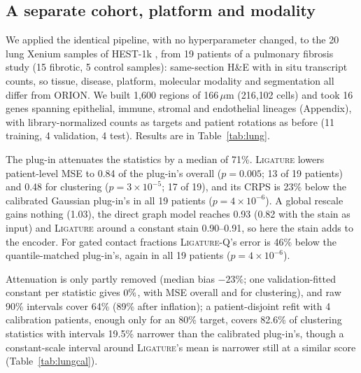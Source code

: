 \documentclass[10pt,letterpaper]{article}
\theoremstyle{definition}
\theoremstyle{remark}
\newcommand{\method}{\textnormal{\textsc{Ligature}}}
\begin{document}
\subsection{A separate cohort, platform and modality}
We applied the identical pipeline, with no hyperparameter changed, to the 20 lung Xenium samples of HEST-1k \citep{hest2024}, from 19 patients of a pulmonary fibrosis study \citep{vannan2025} (15 fibrotic, 5 control samples): same-section H\&E with in situ transcript counts, so tissue, disease, platform, molecular modality and segmentation all differ from ORION. We built 1{,}600 regions of 166\,$\mu$m (216{,}102 cells) and took 16 genes spanning epithelial, immune, stromal and endothelial lineages (Appendix), with library-normalized counts as targets and patient rotations as before (11 training, 4 validation, 4 test). Results are in Table~\ref{tab:lung}.

The plug-in attenuates the statistics by a median of 71\%. \method{} lowers patient-level MSE to 0.84 of the plug-in's overall ($p=0.005$; 13 of 19 patients) and 0.48 for clustering ($p=3\times10^{-5}$; 17 of 19), and its CRPS is 23\% below the calibrated Gaussian plug-in's in all 19 patients ($p=4\times10^{-6}$). A global rescale gains nothing (1.03), the direct graph model reaches 0.93 (0.82 with the stain as input) and \method{} around a constant stain 0.90--0.91, so here the stain adds to the encoder. For gated contact fractions \method{}-Q's error is 46\% below the quantile-matched plug-in's, again in all 19 patients ($p=4\times10^{-6}$).

Attenuation is only partly removed (median bias $-23\%$; one validation-fitted constant per statistic gives $0\%$, with MSE \BaseLungConstAll{} overall and \BaseLungConstSame{} for clustering), and raw 90\% intervals cover 64\% (89\% after inflation); a patient-disjoint refit with 4 calibration patients, enough only for an 80\% target, covers 82.6\% of clustering statistics with intervals 19.5\% narrower than the calibrated plug-in's, though a constant-scale interval around \method{}'s mean is narrower still at a similar score (Table~\ref{tab:lungcal}).

\begin{table}[t]
\centering
\caption{Separate lung cohort (Xenium, 19 held-out patients): patient-level MSE relative to the plug-in over 136 gene-pair statistics (all) and the 16 clustering statistics (same), mean Spearman correlation with measured values, and median relative bias of cohort means.}
\label{tab:lung}

\end{table}
\end{document}
